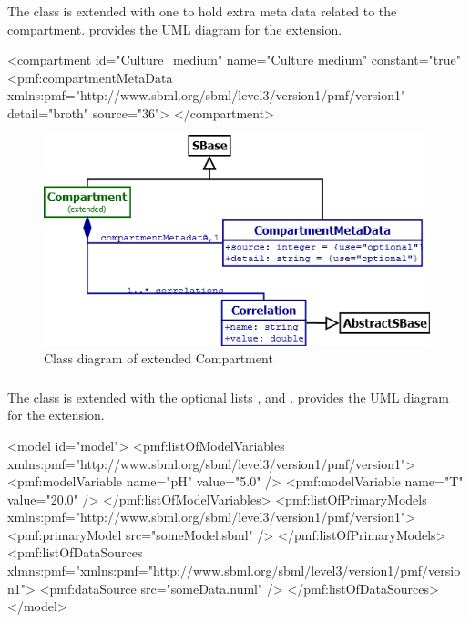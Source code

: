 \subsubsection{}
The \Compartment class is extended with one \CompartmentMetaData to hold extra
meta data related to the compartment.  provides the UML
diagram for the extension.

\begin{example}
<compartment id="Culture_medium" name="Culture medium" constant="true"
  <pmf:compartmentMetaData xmlns:pmf="http://www.sbml.org/sbml/level3/version1/pmf/version1"
    detail="broth" source="36">
</compartment>
\end{example}

\begin{figure}
	\includegraphics[scale=0.8]{img/compartment_uml}
	\caption{Class diagram of extended Compartment}
	\label{compartment_uml}
\end{figure}

\subsubsection{}
The \Model class is extended with the optional lists \ListOfPrimaryModels,
\ListOfDataSources and \ListOfPrimaryModels.  provides the UML
diagram for the extension.

\begin{example}
<model id="model">
  <pmf:listOfModelVariables xmlns:pmf="http://www.sbml.org/sbml/level3/version1/pmf/version1">
    <pmf:modelVariable name="pH" value="5.0" />
    <pmf:modelVariable name="T" value="20.0" />
  </pmf:listOfModelVariables>
  <pmf:listOfPrimaryModels xmlns:pmf="http://www.sbml.org/sbml/level3/version1/pmf/version1">
    <pmf:primaryModel src="someModel.sbml" />
  </pmf:listOfPrimaryModels>
  <pmf:listOfDataSources
    xlmns:pmf="xmlns:pmf="http://www.sbml.org/sbml/level3/version1/pmf/version1">
    <pmf:dataSource src="someData.numl" />
  </pmf:listOfDataSources>
</model>
\end{example}

